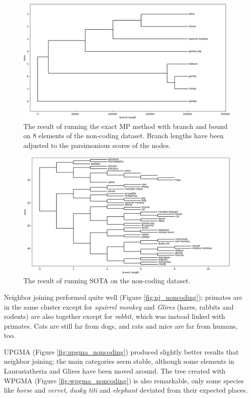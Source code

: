 \documentclass[11pt,twocolumn]{article}
\begin{document}
\begin{figure}
    \centering
    \includegraphics[width=\linewidth]{img/mp_8_taxa_noncoding_2.png}
    \caption{The result of running the exact MP method with branch and bound on 8 elements of the non-coding dataset. Branch lengths have been adjusted to the parsimonious scores of the nodes.}
    \label{fig:mp_noncoding_2}
\end{figure}

\begin{figure}
\centering
\includegraphics[width=\linewidth]{img/sota_noncoding.png}
\caption{The result of running SOTA on the non-coding dataset.}
\label{fig:sota_noncoding}
\end{figure}

Neighbor joining performed quite well (Figure \ref{fig:nj_noncoding}); primates are in the same cluster except for \textit{squirrel monkey} and \textit{Glires} (hares, rabbits and rodents) are also together except for \textit{rabbit}, which was instead linked with primates. Cats are still far from dogs, and rats and mice are far from humans, too.

UPGMA (Figure \ref{fig:upgma_noncoding}) produced slightly better results that neighbor joining; the main categories seem stable, although some elements in Laurasiatheria and Glires have been moved around. The tree created with WPGMA (Figure \ref{fig:wpgma_noncoding}) is also remarkable, only some species like \textit{horse} and \textit{vervet}, \textit{dusky titi} and \textit{elephant} deviated from their expected places.
\end{document}
